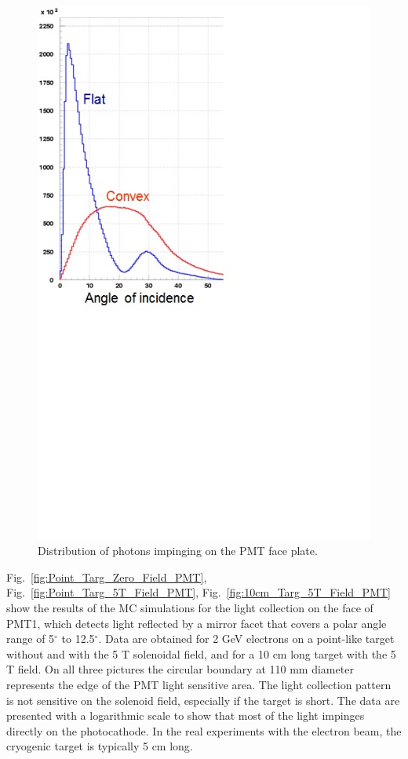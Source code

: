 \begin{figure}[!ht]
    \centering
    \includegraphics[width=1.0\linewidth,trim={0.0cm 9.1cm 6.3cm 0.1cm},clip]{images/Flat_Convex.jpg}
    \caption{Distribution of photons impinging on the PMT face plate.}
    \label{fig:Flat_Convex}
\end{figure}

Fig.~\ref{fig:Point_Targ_Zero_Field_PMT}, Fig.~\ref{fig:Point_Targ_5T_Field_PMT}, Fig.~\ref{fig:10cm_Targ_5T_Field_PMT} show the results of the MC simulations for the light collection on the face of PMT1, which detects light reflected by a mirror facet that covers a polar angle range of 5$^\circ$ to 12.5$^\circ$. Data are obtained for 2 GeV electrons on a point-like target without and with the 5 T solenoidal field, and for a 10 cm long target with the 5 T field. On all three pictures the circular boundary at 110 mm diameter represents the edge of the PMT light sensitive area. The light collection pattern is not sensitive on the solenoid field, especially if the target is short. The data are presented with a logarithmic scale to show that most of the light impinges directly on the photocathode. In the real experiments with the electron beam, the cryogenic target is typically 5 cm long. 

